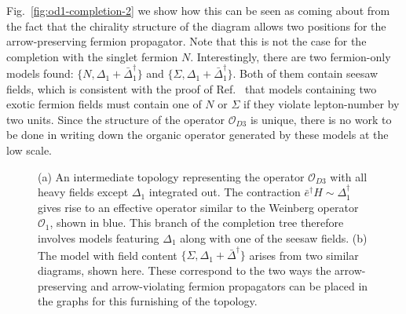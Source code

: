 Fig.~\ref{fig:od1-completion-2} we show how this can be seen as coming about
from the fact that the chirality structure of the diagram allows two positions
for the arrow-preserving fermion propagator. Note that this is not the case for
the completion with the singlet fermion $N$. Interestingly, there are two
fermion-only models found: $\{N, \Delta_{1} + \bar{\Delta}^{\dagger}_{1}\}$ and
$\{\Sigma, \Delta_{1} + \bar{\Delta}^{\dagger}_{1}\}$. Both of them contain
seesaw fields, which is consistent with the proof of Ref.~\cite{Klein:2019iws}
that models containing two exotic fermion fields must contain one of $N$ or
$\Sigma$ if they violate lepton-number by two units. Since the structure of the
operator $\mathcal{O}_{D3}$ is unique, there is no work to be done in writing
down the organic operator generated by these models at the low scale.

\begin{figure}[t]
  \centering
  \caption{(a) An intermediate topology representing the operator
    $\mathcal{O}_{D3}$ with all heavy fields except $\Delta_{1}$ integrated out.
    The contraction $\bar{e}^{\dagger} H \sim \Delta^{\dagger}_{1}$ gives rise
    to an effective operator similar to the Weinberg operator $\mathcal{O}_{1}$,
    shown in blue. This branch of the completion tree therefore involves models
    featuring $\Delta_{1}$ along with one of the seesaw fields. (b) The model
    with field content $\{\Sigma, \Delta_{1} + \bar{\Delta}^{\dagger}\}$ arises
    from two similar diagrams, shown here. These correspond to the two ways the
    arrow-preserving and arrow-violating fermion propagators can be placed in
    the graphs for this furnishing of the topology.}
  \label{fig:od1-completion}
\end{figure}


